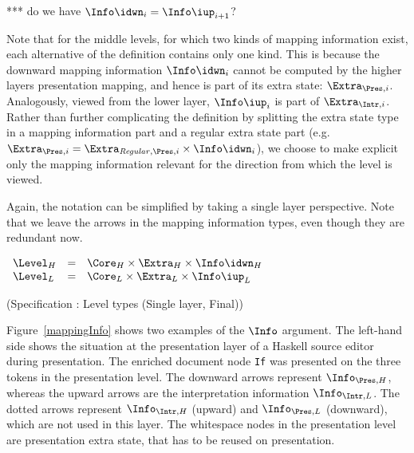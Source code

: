 *** do we have $\Info\idwn_i = \Info\iup_{i+1}$?

Note that for the middle levels, for which two kinds of mapping information exist, each alternative of the definition contains only one kind. This is because the downward mapping information $\Info\idwn_{i}$ cannot be computed by the higher layers presentation mapping, and hence is part of its extra state: $\Extra_{\Pres,i}$. Analogously, viewed from the lower layer, $\Info\iup_{i}$ is part of $\Extra_{\Intr,i}$. Rather than further complicating the definition by splitting the extra state type in a mapping information part and a regular extra state part (e.g.\ $\Extra_{\Pres,i} = \Extra_{\mathit{Regular},\Pres,i} \times \Info\idwn_{i}$), we choose to make explicit only the mapping information relevant for the direction from which the level is viewed.
\ec

\bc
Again, the notation can be simplified by taking a single layer perspective. Note that we leave the arrows in the  mapping information types, even though they are redundant now.

\begin{small}
 \label{spec:levelSingleFinal}
\(\begin{array}{lcll} \label{spec:extraStateSL}
\Level_{H} & = & \Core_{H} \times \Extra_{H} \times \Info\idwn_{H}\\
\Level_{L} & = & \Core_{L} \times \Extra_{L} \times \Info\iup_{L}\\
\end{array}\)\end{small}
\begin{center}(Specification \thespecification: Level types (Single layer, Final))\end{center}\vspace{1em}
\ec

\bc
Figure~\ref{mappingInfo} shows two examples of the $\Info$ argument. The left-hand side shows the situation at the presentation layer of a Haskell source editor during presentation.  The enriched document node \verb|If|  was presented on the three tokens in the presentation level. The downward arrows represent $\Info_{\Pres,H}$, whereas the upward arrows are the interpretation information $\Info_{\Intr, L}$. The dotted arrows represent $\Info_{\Intr,H}$ (upward) and $\Info_{\Pres,L}$ (downward), which are not used in this layer. The whitespace nodes in the presentation level are presentation extra state, that has to be reused on presentation. 

